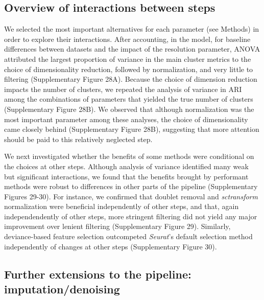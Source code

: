 \documentclass{bmcart}
\begin{document}
{\color{red}\subsection*{Overview of interactions between steps}

We selected the most important alternatives for each parameter (see Methods) in order to explore their interactions. After accounting, in the model, for baseline differences between datasets and the impact of the resolution parameter, ANOVA attributed the largest proportion of variance in the main cluster metrics to the choice of dimensionality reduction, followed by normalization, and very little to filtering (Supplementary Figure 28A). Because the choice of dimension reduction impacts the number of clusters, we repeated the analysis of variance in ARI among the combinations of parameters that yielded the true number of clusters (Supplementary Figure 28B). We observed that although normalization was the most important parameter among these analyses, the choice of dimensionality came closely behind (Supplementary Figure 28B), suggesting that more attention should be paid to this relatively neglected step.

We next investigated whether the benefits of some methods were conditional on the choices at other steps. Although analysis of variance identified many weak but significant interactions, we found that the benefits brought by performant methods were robust to differences in other parts of the pipeline (Supplementary Figures 29-30). For instance, we confirmed that doublet removal and \textit{sctransform} normalization were beneficial independently of other steps, and that, again independendently of other steps, more stringent filtering did not yield any major improvement over lenient filtering (Supplementary Figure 29). Similarly, deviance-based feature selection outcompeted \textit{Seurat}'s default selection method independently of changes at other steps (Supplementary Figure 30).}

\subsection*{Further extensions to the pipeline: imputation/denoising}
\end{document}
